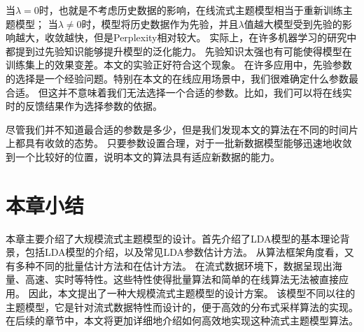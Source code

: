 当$\lambda = 0$时，也就是不考虑历史数据的影响，在线流式主题模型相当于重新训练主题模型；
当$\lambda \ne 0 $时，模型将历史数据作为先验，并且$\lambda$值越大模型受到先验的影响越大，收敛越快，但是Perplexity相对较大。
实际上，在许多机器学习的研究中都提到过先验知识能够提升模型的泛化能力。
先验知识太强也有可能使得模型在训练集上的效果变差。本文的实验正好符合这个现象。
在许多应用中，先验参数的选择是一个经验问题。特别在本文的在线应用场景中，我们很难确定什么参数最合适。
但这并不意味着我们无法选择一个合适的参数。比如，我们可以将在线实时的反馈结果作为选择参数的依据。

尽管我们并不知道最合适的参数是多少，但是我们发现本文的算法在不同的时间片上都具有收敛的态势。
只要参数设置合理，对于一批新数据模型能够迅速地收敛到一个比较好的位置，说明本文的算法具有适应新数据的能力。

\section{本章小结}
本章主要介绍了大规模流式主题模型的设计。首先介绍了LDA模型的基本理论背景，包括LDA模型的介绍，以及常见LDA参数估计方法。
从算法框架角度看，又有多种不同的批量估计方法和在估计方法。
在流式数据环境下，数据呈现出海量、高速、实时等特性。这些特性使得批量算法和简单的在线算法无法被直接应用。
因此，本文提出了一种大规模流式主题模型的设计方案。
该模型不同以往的主题模型，它是针对流式数据特性而设计的，便于高效的分布式采样算法的实现。
在后续的章节中，本文将更加详细地介绍如何高效地实现这种流式主题模型算法。
